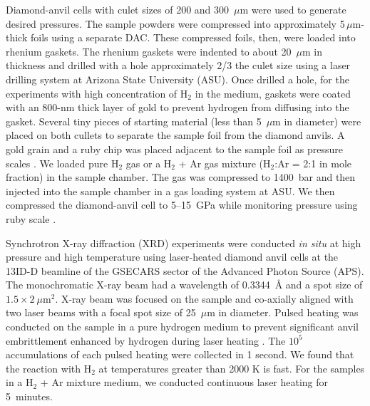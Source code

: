 \documentclass[draft,jgrga,12pt]{agujournal2019}
\begin{document}
Diamond-anvil cells with culet sizes of 200 and 300~{$\mu\mathrm{m}$} were used to generate desired pressures. 
The sample powders were compressed into approximately 5\,{$\mu\mathrm{m}$}-thick foils using a separate DAC\@. 
These compressed foils, then, were loaded into rhenium gaskets. 
The rhenium gaskets were indented to about 20~{$\mu\mathrm{m}$} in thickness and drilled with a hole approximately 2/3 the culet size using a laser drilling system at Arizona State University (ASU). 
Once drilled a hole, for the experiments with high concentration of H$_2$ in the medium,  gaskets  were coated with an 800-nm thick layer of gold to prevent hydrogen from diffusing into the gasket. 
Several tiny pieces of starting material (less than 5~$\mu$m in diameter) were placed on both cullets to separate the sample foil from the  diamond anvils. 
A gold grain and a ruby chip was placed adjacent to the sample foil as pressure scales \cite{fei_internally_2007, mao_calibration_1986}. %
We loaded pure H$_2$ gas or a H$_2$ + Ar gas mixture (H$_2$:Ar = 2:1 in mole fraction)  in the sample chamber. 
The gas was compressed to 1400~bar and then injected into the sample chamber in a gas loading system at ASU\@. 
We then compressed the diamond-anvil cell to 5--15~GPa while monitoring pressure using ruby scale \cite{mao_calibration_1986}. 

Synchrotron X-ray diffraction (XRD) experiments were conducted \textit{in situ} at high pressure and high temperature using laser-heated diamond anvil cells at the 13ID-D beamline of the GSECARS sector of the Advanced Photon Source (APS). 
The monochromatic X-ray beam  had a wavelength of 0.3344~{\AA} and a spot size of $1.5{\times} 2~\mu\mathrm{m}^2$. 
X-ray beam was focused on the sample and co-axially aligned with two laser  beams with a focal spot size of 25~$\mu$m in diameter.  
Pulsed heating was conducted on the sample in a pure hydrogen medium to prevent significant anvil embrittlement enhanced by hydrogen during laser heating \cite{prakapenka_advanced_2008,silvera_metallic_2018}. %
The $10^5$ accumulations of each pulsed heating were collected in 1 second. 
We found that the reaction with H$_2$ at temperatures greater than 2000 {K} is fast. 
For the samples in a H$_2$ + Ar mixture medium, we conducted continuous laser heating for 5~minutes. 
\end{document}
